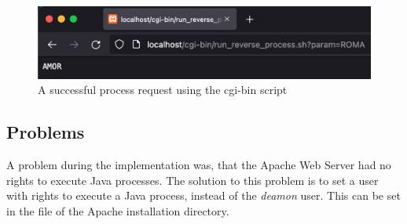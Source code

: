 \begin{figure}[h]
\centering
\includegraphics[scale=0.6]{images/part2Success}
\caption{A successful process request using the cgi-bin script}
\label{fig:02_part2_impl_success}
\end{figure}

\subsection{Problems}\label{subsec:02_part2_concl}
A problem during the implementation was, that the Apache Web Server had no rights to execute Java processes. The solution to this problem is to set a user with rights to execute a Java process, instead of the \textit{deamon} user. This can be set in the  file of the Apache installation directory.